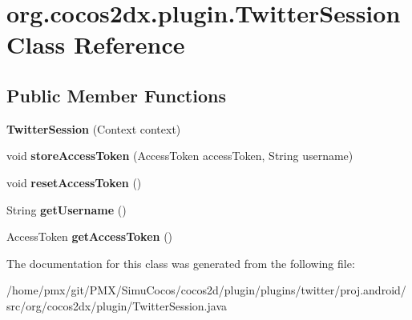 \hypertarget{classorg_1_1cocos2dx_1_1plugin_1_1TwitterSession}{}\section{org.\+cocos2dx.\+plugin.\+Twitter\+Session Class Reference}
\label{classorg_1_1cocos2dx_1_1plugin_1_1TwitterSession}
\subsection*{Public Member Functions}
\begin{DoxyCompactItemize}
\item 
\mbox{\label{classorg_1_1cocos2dx_1_1plugin_1_1TwitterSession_a9bd8a39de122dba2214db2b68110e69f}} 
{\bfseries Twitter\+Session} (Context context)
\item 
\mbox{\label{classorg_1_1cocos2dx_1_1plugin_1_1TwitterSession_a12077da182086595a02fca2254d085a6}} 
void {\bfseries store\+Access\+Token} (Access\+Token access\+Token, String username)
\item 
\mbox{\label{classorg_1_1cocos2dx_1_1plugin_1_1TwitterSession_a5f056bf515a6dcb7b44d8e66d9554e4b}} 
void {\bfseries reset\+Access\+Token} ()
\item 
\mbox{\label{classorg_1_1cocos2dx_1_1plugin_1_1TwitterSession_aa9ab222881aa19e1aa796f6a0c9ef164}} 
String {\bfseries get\+Username} ()
\item 
\mbox{\label{classorg_1_1cocos2dx_1_1plugin_1_1TwitterSession_a1d29e32f1ebca48e6c771684974d326a}} 
Access\+Token {\bfseries get\+Access\+Token} ()
\end{DoxyCompactItemize}


The documentation for this class was generated from the following file\+:\begin{DoxyCompactItemize}
\item 
/home/pmx/git/\+P\+M\+X/\+Simu\+Cocos/cocos2d/plugin/plugins/twitter/proj.\+android/src/org/cocos2dx/plugin/Twitter\+Session.\+java\end{DoxyCompactItemize}
